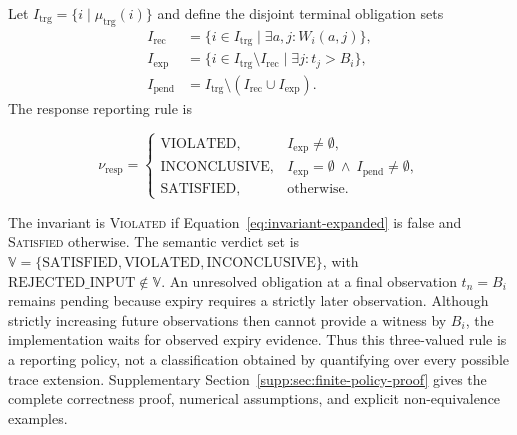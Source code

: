 Let $I_{\mathrm{trg}}=\{i\mid\mu_{\mathrm{trg}}(i)\}$ and define the disjoint terminal obligation sets
\begin{equation}
\begin{aligned}
I_{\mathrm{rec}}&=\{i\in I_{\mathrm{trg}}\mid\exists a,j:W_i(a,j)\},\\
I_{\mathrm{exp}}&=\{i\in I_{\mathrm{trg}}\setminus I_{\mathrm{rec}}\mid
                         \exists j:t_j>B_i\},\\
I_{\mathrm{pend}}&=I_{\mathrm{trg}}\setminus
                         (I_{\mathrm{rec}}\cup I_{\mathrm{exp}}).
\end{aligned}
\label{eq:response-partition}
\end{equation}
The response reporting rule is
\par\noindent\begin{minipage}{\linewidth}\small
\begin{equation}
\nu_{\mathrm{resp}}=
\begin{cases}
\mathrm{VIOLATED}, & I_{\mathrm{exp}}\neq\emptyset,\\
\mathrm{INCONCLUSIVE}, & I_{\mathrm{exp}}=\emptyset\ \land\ I_{\mathrm{pend}}\neq\emptyset,\\
\mathrm{SATISFIED}, & \text{otherwise}.
\end{cases}
\label{eq:response-verdict}
\end{equation}
\end{minipage}\par

The invariant is \textsc{Violated} if Equation~\eqref{eq:invariant-expanded} is false and \textsc{Satisfied} otherwise. The semantic verdict set is $\mathbb{V}=\{\mathrm{SATISFIED},\allowbreak\mathrm{VIOLATED},\allowbreak\mathrm{INCONCLUSIVE}\}$, with $\mathrm{REJECTED\_INPUT}\notin\mathbb{V}$. An unresolved obligation at a final observation $t_n=B_i$ remains pending because expiry requires a strictly later observation. Although strictly increasing future observations then cannot provide a witness by $B_i$, the implementation waits for observed expiry evidence. Thus this three-valued rule is a reporting policy, not a classification obtained by quantifying over every possible trace extension. Supplementary Section~\ref{supp:sec:finite-policy-proof} gives the complete correctness proof, numerical assumptions, and explicit non-equivalence examples.
